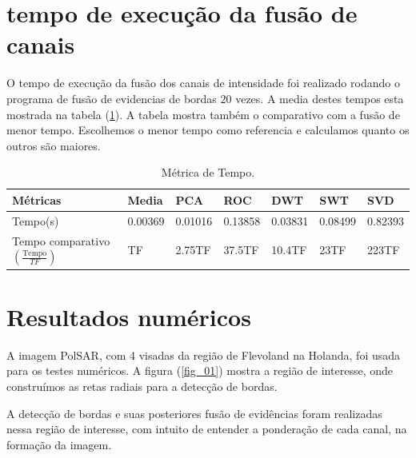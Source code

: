 \documentclass[conference]{IEEEtran}
\begin{document}
\section{tempo de execução da fusão de canais} 
O tempo de execução da fusão dos canais de intensidade foi realizado rodando o programa de fusão de evidencias de bordas $20$ vezes. A media destes tempos esta mostrada na tabela (\ref{metrica_de_tempo}). A tabela mostra  também o comparativo com a fusão de menor tempo. Escolhemos o menor tempo como referencia e calculamos quanto os outros são maiores.   
\begin{table}[hbt]
	\centering
	\tiny
	\caption{Métrica de Tempo.}
	\label{metrica_de_tempo}
\begin{tabular}{@{}lllllll@{}} \toprule
	Métricas & Media   &   PCA   &  ROC   & DWT     &  SWT     &  SVD \\ \midrule
	Tempo(s)    & 0.00369 & 0.01016 &0.13858 & 0.03831&  0.08499 & 0.82393  \\
    Tempo comparativo $\left(\frac{\text{Tempo}}{TF}\right)$& TF & 2.75TF &37.5TF & 10.4TF   &  23TF& 223TF  \\ \bottomrule
\end{tabular}
\end{table}

  
\section{Resultados numéricos}\label{sec_07}

A imagem PolSAR, com 4 visadas da região de Flevoland na Holanda, foi usada para os testes numéricos. A figura (\ref{fig_01}) mostra a região de interesse, onde construímos as retas radiais para a detecção de bordas.

 A detecção de bordas e suas posteriores fusão de evidências foram realizadas nessa região de interesse, com intuito de entender a ponderação de cada canal, na formação da imagem.
\end{document}
